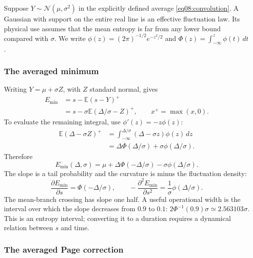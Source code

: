 \documentclass[11pt,letterpaper]{article}
\theoremstyle{plain}
\theoremstyle{definition}
\theoremstyle{remark}
\begin{document}
Suppose $Y\sim\mathcal N(\mu,\sigma^2)$ in the explicitly defined average
\eqref{eq08:convolution}. A Gaussian with support on the entire real line is
an effective fluctuation law. Its physical use assumes that the mean entropy
is far from any lower bound compared with $\sigma$. We write
$\phi(z)=(2\pi)^{-1/2}e^{-z^2/2}$ and
$\Phi(z)=\int_{-\infty}^z\phi(t)\,dt$.

\subsubsection{The averaged minimum}
\label{subsec08:broadened_min}

Writing $Y=\mu+\sigma Z$, with $Z$ standard normal, gives
\begin{align}
 E_{\mathrm{min}}
 &=s-\mathbb E(s-Y)^+\nonumber\\
 &=s-\sigma\mathbb E(\Delta/\sigma-Z)^+,
 \qquad x^+=\max(x,0).
 \label{eq08:min_via_call}
\end{align}
To evaluate the remaining integral, use $\phi'(z)=-z\phi(z)$:
\begin{align}
 \mathbb E(\Delta-\sigma Z)^+
 &=\int_{-\infty}^{\Delta/\sigma}(\Delta-\sigma z)\phi(z)\,dz\nonumber\\
 &=\Delta\Phi(\Delta/\sigma)+\sigma\phi(\Delta/\sigma).
\end{align}
Therefore
\begin{equation}
 E_{\mathrm{min}}(\Delta,\sigma)
 =\mu+\Delta\Phi(-\Delta/\sigma)-\sigma\phi(\Delta/\sigma).
 \label{eq08:broadened_min}
\end{equation}
The slope is a tail probability and the curvature is minus the fluctuation
density:
\begin{equation}
 \frac{\partial E_{\mathrm{min}}}{\partial s}=\Phi(-\Delta/\sigma),
 \qquad
 -\frac{\partial^2 E_{\mathrm{min}}}{\partial s^2}
 =\frac{1}{\sigma}\phi(\Delta/\sigma).
 \label{eq08:curvature}
\end{equation}
The mean-branch crossing has slope one half. A useful operational width is the
interval over which the slope decreases from $0.9$ to $0.1$:
$2\Phi^{-1}(0.9)\sigma\simeq2.563103\sigma$. This is an entropy interval;
converting it to a duration requires a dynamical relation between $s$ and time.

\subsubsection{The averaged Page correction}
\label{subsec08:broadened_corr}
\end{document}
